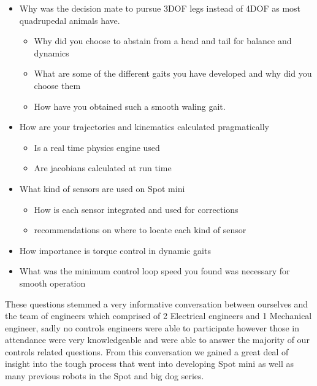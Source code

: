         \begin{itemize}
            \item Why was the decision mate to pursue 3DOF legs instead of 4DOF as most quadrupedal animals have. 
            \begin{itemize}
                \item Why did you choose to abstain from a head and tail for balance and dynamics
                \item What are some of the different gaits you have developed and why did you choose them
                \item How have you obtained such a smooth waling gait.
            \end{itemize}
            \item How are your trajectories and kinematics calculated pragmatically
                \begin{itemize}
                    \item Is a real time physics engine used
                    \item Are jacobians calculated at run time
                \end{itemize}
            \item What kind of sensors are used on Spot mini
                \begin{itemize}
                    \item How is each sensor integrated and used for corrections
                    \item recommendations on where to locate each kind of sensor
                \end{itemize}
            \item How importance is torque control in dynamic gaits
            \item What was the minimum control loop speed you found was necessary for smooth operation
        \end{itemize}
        These questions stemmed a very informative conversation between ourselves and the team of engineers which comprised of 2 Electrical engineers and 1 Mechanical engineer, sadly no controls engineers were able to participate however those in attendance were very knowledgeable and were able to answer the majority of our controls related questions. From this conversation we gained a great deal of insight into the tough process that went into developing Spot mini as well as many previous robots in the Spot and big dog series. 

